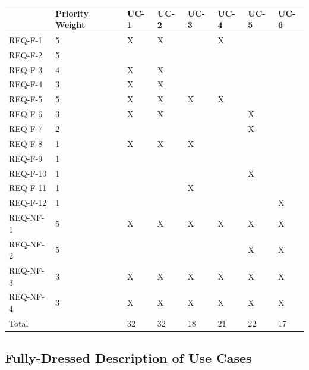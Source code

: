 \documentclass[letterpaper,english, 12pt]{scrreprt}
\begin{document}
\renewcommand{\arraystretch}{0.4}
\begin{center}
        \begin{tabular}{|C{1cm}|C{1cm}|C{1cm}|C{1cm}|C{1cm}|C{1cm}|C{1cm}|C{1cm}|}
                \hline
                         & Priority Weight & UC-1 & UC-2 & UC-3 & UC-4 & UC-5 & UC-6 \\
                \hline
                        REQ-F-1 & 5 & X & X & & X & &  \\
                \hline
                        REQ-F-2 & 5 & & & & & &  \\
                \hline
                        REQ-F-3 & 4 & X & X & & & &  \\
                \hline
                        REQ-F-4 & 3 & X & X & & & &  \\
                \hline
                        REQ-F-5 & 5 & X & X & X & X & & \\
                \hline
                        REQ-F-6 & 3 & X & X & & & X & \\
                \hline
                        REQ-F-7 & 2 & & & & & X &  \\
                \hline
                        REQ-F-8 & 1 & X & X & X & & &  \\
                \hline
                        REQ-F-9 & 1 & & & & & &  \\
                \hline
                        REQ-F-10 & 1 & & & & & X &  \\
                \hline
                        REQ-F-11 & 1 & & & X & & &  \\
                \hline
                        REQ-F-12 & 1 & & & & & & X  \\
                \hline
                        REQ-NF-1 & 5 & X & X & X & X & X & X  \\
                \hline
                        REQ-NF-2 & 5 & & & & & X & X  \\
                \hline
                        REQ-NF-3 & 3 & X & X & X & X & X & X  \\
                \hline
                        REQ-NF-4 & 3 & X & X & X & X & X & X  \\
                \hline
                        Total & & 32 & 32 & 18 & 21 & 22 & 17  \\
                \hline
        \end{tabular}
\end{center}


\subsection{Fully-Dressed Description of Use Cases}
\end{document}
